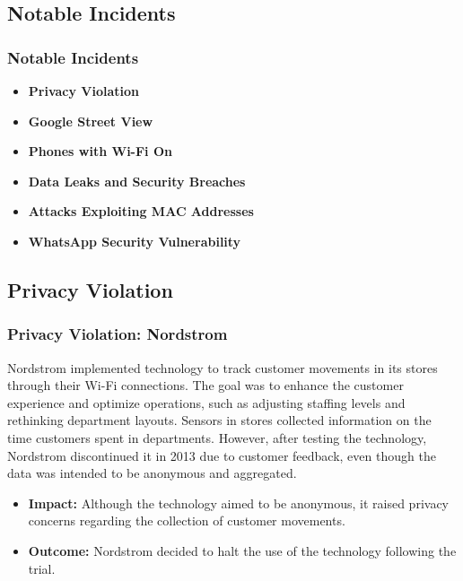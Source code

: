 \documentclass[
english,
svgnames,
notes=hide,
12pt]{beamer}
\begin{document}
\begin{frame}
  \section{Notable Incidents}
  \frametitle{Notable Incidents}
  \begin{itemize}
    \item \textbf{Privacy Violation} \pause
    \item \textbf{Google Street View} \pause
    \item \textbf{Phones with Wi-Fi On} \pause
    \item \textbf{Data Leaks and Security Breaches} \pause
    \item \textbf{Attacks Exploiting MAC Addresses} \pause
    \item \textbf{WhatsApp Security Vulnerability} 
  \end{itemize}
\end{frame}

\begin{frame}
  \section{Privacy Violation}
  \frametitle{Privacy Violation: Nordstrom}
  Nordstrom implemented technology to track customer movements in its stores through their Wi-Fi connections. The goal was to enhance the customer experience and optimize operations, such as adjusting staffing levels and rethinking department layouts. Sensors in stores collected information on the time customers spent in departments. However, after testing the technology, Nordstrom discontinued it in 2013 due to customer feedback, even though the data was intended to be anonymous and aggregated.
  \begin{itemize}
    \item \textbf{Impact:} Although the technology aimed to be anonymous, it raised privacy concerns regarding the collection of customer movements. \pause
    \item \textbf{Outcome:} Nordstrom decided to halt the use of the technology following the trial. 
  \end{itemize}
\end{frame}
\end{document}
